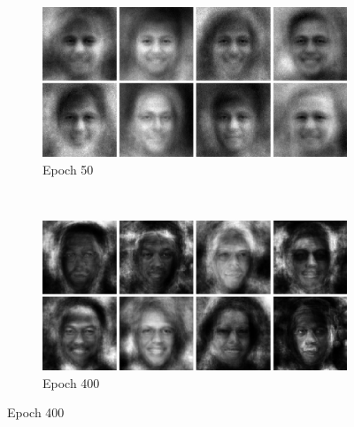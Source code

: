 \begin{figure}[h!]
    \centering
    \begin{subfigure}[b]{0.45\textwidth}
        \includegraphics[width=\textwidth]{fig/vae/ffhq_epoch50}
        \caption{Epoch 50}
    \end{subfigure}
    ~
    \begin{subfigure}[b]{0.45\textwidth}
         \includegraphics[width=\textwidth]{fig/vae/ffhq_epoch400}
        \caption{Epoch 400}
    \end{subfigure}


\end{figure}
